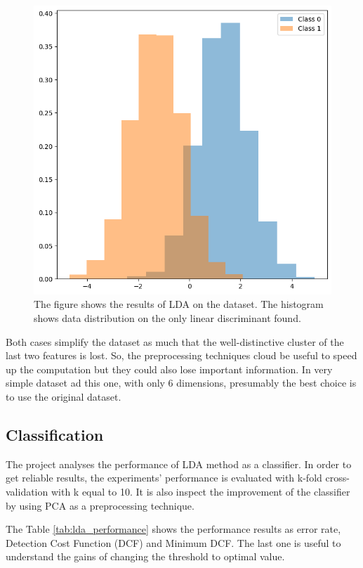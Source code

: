\documentclass{article}
\begin{document}
\begin{figure}[ht]
    \centering
    \includegraphics[width=\textwidth]{images/dataset_lda.png}
    \caption{The figure shows the results of LDA on the dataset. The histogram shows data distribution on the only linear discriminant found.}
    \label{fig:dataset_lda}
\end{figure}

Both cases simplify the dataset as much that the well-distinctive cluster of the last two features is lost. So, the preprocessing techniques cloud be useful to speed up the computation but they could also lose important information. In very simple dataset ad this one, with only 6 dimensions, presumably the best choice is to use the original dataset.

\subsection{Classification}
The project analyses the performance of LDA method as a classifier. In order to get reliable results, the experiments' performance is evaluated with k-fold cross-validation with k equal to 10. It is also inspect the improvement of the classifier by using PCA as a preprocessing technique.

The Table \ref{tab:lda_performance} shows the performance results as error rate, Detection Cost Function (DCF) and Minimum DCF. The last one is useful to understand the gains of changing the threshold to optimal value.
\end{document}
